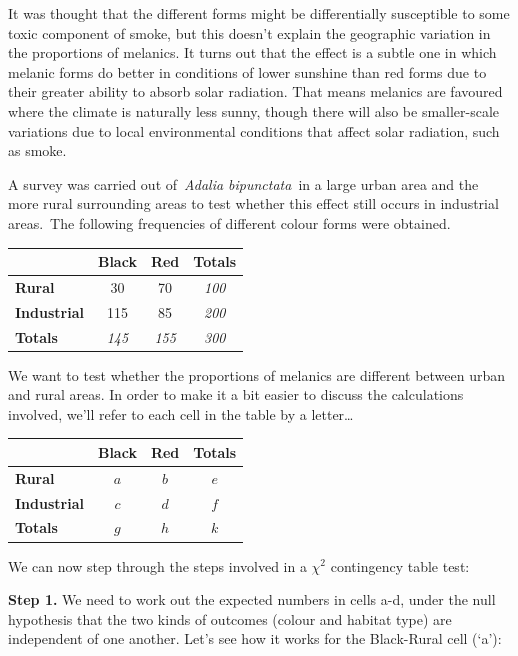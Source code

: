 \documentclass[
]{book}
\begin{document}
It was thought that the different forms might be differentially susceptible to some toxic component of smoke, but this doesn't explain the geographic variation in the proportions of melanics. It turns out that the effect is a subtle one in which melanic forms do better in conditions of lower sunshine than red forms due to their greater ability to absorb solar radiation. That means melanics are favoured where the climate is naturally less sunny, though there will also be smaller-scale variations due to local environmental conditions that affect solar radiation, such as smoke.

A survey was carried out of~\emph{Adalia bipunctata}~in a large urban area and the more rural surrounding areas to test whether this effect still occurs in industrial areas.~The following frequencies of different colour forms were obtained.

\begin{longtable}[]{@{}lccc@{}}
\toprule()
& Black & Red & Totals \\
\midrule()
\endhead
\textbf{Rural} & 30 & 70 & \emph{100} \\
\textbf{Industrial} & 115 & 85 & \emph{200} \\
\textbf{Totals} & \emph{145} & \emph{155} & \emph{300} \\
\bottomrule()
\end{longtable}

We want to test whether the proportions of melanics are different between urban and rural areas. In order to make it a bit easier to discuss the calculations involved, we'll refer to each cell in the table by a letter\ldots{}

\begin{longtable}[]{@{}lccc@{}}
\toprule()
& Black & Red & Totals \\
\midrule()
\endhead
\textbf{Rural} & \(a\) & \(b\) & \(e\) \\
\textbf{Industrial} & \(c\) & \(d\) & \(f\) \\
\textbf{Totals} & \(g\) & \(h\) & \(k\) \\
\bottomrule()
\end{longtable}

We can now step through the steps involved in a \(\chi^{2}\) contingency table test:

\textbf{Step 1.} We need to work out the expected numbers in cells a-d, under the null hypothesis that the two kinds of outcomes (colour and habitat type) are independent of one another. Let's see how it works for the Black-Rural cell (`a'):
\end{document}
